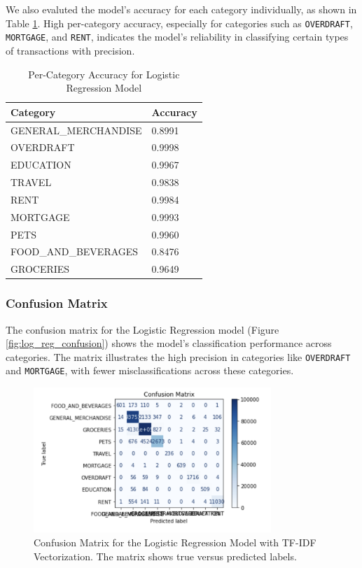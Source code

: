 \documentclass[12pt,letterpaper]{article}
\begin{document}
We also evaluted the model’s accuracy for each category individually, as shown in Table \ref{table:category_accuracy_logreg}. High per-category accuracy, especially for categories such as \texttt{OVERDRAFT}, \texttt{MORTGAGE}, and \texttt{RENT}, indicates the model's reliability in classifying certain types of transactions with precision.

\begin{table}[h]
    \centering
    \begin{tabular}{ll}
        \hline
        \textbf{Category} & \textbf{Accuracy} \\
        \hline
        GENERAL\_MERCHANDISE & 0.8991 \\
        OVERDRAFT & 0.9998 \\
        EDUCATION & 0.9967 \\
        TRAVEL & 0.9838 \\
        RENT & 0.9984 \\
        MORTGAGE & 0.9993 \\
        PETS & 0.9960 \\
        FOOD\_AND\_BEVERAGES & 0.8476 \\
        GROCERIES & 0.9649 \\
        \hline
    \end{tabular}
    \caption{Per-Category Accuracy for Logistic Regression Model}
    \label{table:category_accuracy_logreg}
\end{table}

\subsubsection{Confusion Matrix}
The confusion matrix for the Logistic Regression model (Figure \ref{fig:log_reg_confusion}) shows the model's classification performance across categories. The matrix illustrates the high precision in categories like \texttt{OVERDRAFT} and \texttt{MORTGAGE}, with fewer misclassifications across these categories. 

\begin{figure}[h]
    \centering
    \includegraphics[width=0.8\textwidth]{figure/log_reg_confusion.png}
    \caption{Confusion Matrix for the Logistic Regression Model with TF-IDF Vectorization. The matrix shows true versus predicted labels.}
    \label{fig:confusion_matrix_logreg}
\end{figure}
\end{document}
